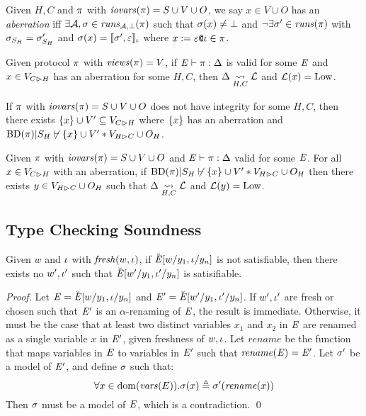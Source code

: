 \begin{definition}
  Given $H,C$ and $\pi$ with $\mathit{iovars}(\pi) = S \cup V \cup O$,
  we say $x \in V \cup O$ has an \emph{aberration} iff
  $\exists \mathcal{A}, \sigma \in \mathit{runs}_{\mathcal{A},\bot}(\pi)$ such that
  $\sigma(x) \ne \bot$ and $\neg\exists \sigma' \in \mathit{runs}(\pi)$
  with  $\sigma_{S_H} = \sigma'_{S_H}$ and
  $\sigma(x) = \llbracket \sigma',\varepsilon \rrbracket_{\iota}$ where
  $x := \varepsilon\texttt{@}\iota \in \pi$.
\end{definition}

\begin{lemma}
  Given protocol $\pi$ with
  $\mathit{views}(\pi) = V$, if 
  $\mathit{E} \vdash \pi : \Delta$ is valid
  for some $\mathit{E}$ and $x \in V_{C \rhd H}$ has an
  aberration for some $H,C$, then $\Delta \underset{H,C}{\leadsto} \mathcal{L}$
  and $\mathcal{L}(x) = \mathrm{Low}$.
\end{lemma}

\begin{lemma}
  If $\pi$ with $\mathit{iovars}(\pi) = S \cup V \cup O$ does not have
  integrity for some $H,C$, then there exists $\{ x \} \cup V'
  \subseteq V_{C \rhd H}$ where $\{ x \}$ has an aberration and
  $\mathrm{BD}(\pi)|S_H \not\vdash \{ x \} \cup V' * V_{H \rhd C} \cup O_H$.
\end{lemma}

\begin{lemma}
  Given $\pi$ with $\mathit{iovars}(\pi) = S \cup V \cup O$ and
  $\mathit{E} \vdash \pi : \Delta$ valid for some $\mathit{E}$.  For all $x \in
  V_{C \rhd H}$ with an aberration, if
  $\mathrm{BD}(\pi)|S_H \not\vdash \{ x \} \cup V' * V_{H \rhd C} \cup O_H$
  then there exists $y \in V_{H \rhd C} \cup O_H$ such that
  $\Delta \underset{H,C}{\leadsto} \mathcal{L}$ and $\mathcal{L}(y) = \mathrm{Low}$.
\end{lemma}

\subsection{Type Checking Soundness}

\begin{lemma}
  \label{lemma-fresh}
  Given $w$ and $\iota$ with $\mathit{fresh}(w,\iota)$, if $\breve{\mathit{E}}[w/y_1,\iota/y_n]$
  is not satisfiable, then there exists no $w',\iota'$ such that
  $\breve{\mathit{E}}[w'/y_1,\iota'/y_n]$ is satisifiable.
\end{lemma}

\begin{proof}
  Let $\mathit{E} = \breve{\mathit{E}}[w/y_1,\iota/y_n]$ and $\mathit{E}' =
  \breve{\mathit{E}}[w'/y_1,\iota'/y_n]$. If $w',\iota'$ are fresh or chosen
  such that $\mathit{E}'$ is an $\alpha$-renaming of $\mathit{E}$, the result is
  immediate.  Otherwise, it must be the case that at least two
  distinct variables $x_1$ and $x_2$ in $\mathit{E}$ are renamed as a single
  variable $x$ in $\mathit{E}'$, given freshness of $w,\iota$. Let
  $\mathit{rename}$ be the function that maps variables in $\mathit{E}$ to
  variables in $\mathit{E}'$ such that $\mathit{rename}(\mathit{E}) = \mathit{E}'$. Let
  $\sigma'$ be a model of $\mathit{E}'$, and define $\sigma$ such that:
  $$
  \forall x \in \mathrm{dom}(\mathit{vars}(E)) . \sigma(x) \triangleq \sigma'(\mathit{rename}(x)) 
  $$
  Then $\sigma$ must be a model of $\mathit{E}$, which is a contradiction. \qed
\end{proof}

